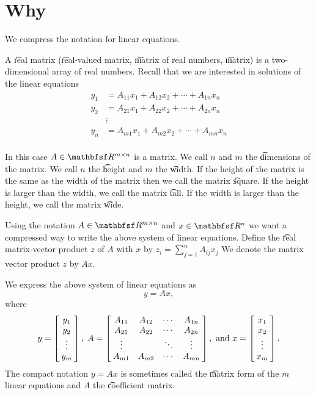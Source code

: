 
\section{Why}
We compress the notation for linear equations.

A \t{real matrix} (\t{real-valued matrix}, \t{matrix of real numbers}, \t{matrix}) is a two-dimensional array of real numbers.
Recall that we are interested in solutions of the linear equations
  \[
\begin{aligned}
y_1 &= A_{11}x_1 + A_{12}x_2 + \cdots + A_{1n}x_n \\
y_2 &= A_{21}x_1 + A_{22}x_2 + \cdots + A_{2n}x_n \\
&\vdots \\
y_n &= A_{m1}x_1 + A_{m2}x_2 + \cdots + A_{mn}x_n \\
\end{aligned}
  \]

In this case $A \in \R^{m \times n}$ is a matrix.
We call $n$ and $m$ the \t{dimensions} of the matrix.
We call $n$ the \t{height} and $m$ the \t{width}.
If the height of the matrix is the same as the width of the matrix then we call the matrix \t{square}.
If the height is larger than the width, we call the matrix \t{tall}.
If the width is larger than the height, we call the matrix \t{wide}.

Using the notation $A \in \R^{m \times n}$ and $x \in \R^n$ we want a compressed way to write the above system of linear equations.
Define the \t{real matrix-vector product} $z$ of $A$ with $x$ by $z_{i} = \sum_{j = 1}^{n} A_{ij}x_j$
We denote the matrix vector product $z$ by $Ax$.

We express the above system of linear equations as
  \[
y = Ax,
  \]
where {\small
  \[
y = \bmat{y_1 \\ y_2 \\ \vdots \\ y_m}, \;
A = \bmat{
A_{11} & A_{12} & \cdots & A_{1n} \\
A_{21} & A_{22} & \cdots & A_{2n} \\
\vdots & & \ddots & \vdots \\
A_{m1} & A_{m2} & \cdots & A_{mn} \\
}, \text{ and }
x = \bmat{x_1 \\ x_2 \\ \vdots \\ x_m}.
  \]
}
The compact notation $y = Ax$ is sometimes called the \t{matrix form} of the $m$ linear equations and $A$ the \t{coefficient matrix}.

